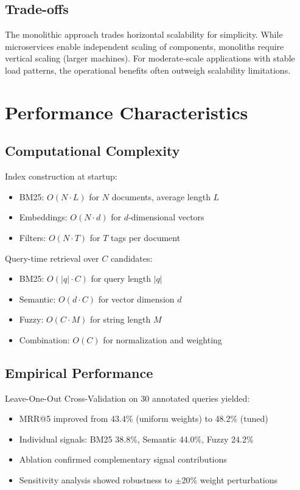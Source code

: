 \subsection{Trade-offs}

The monolithic approach trades horizontal scalability for simplicity. While microservices enable independent scaling of components, monoliths require vertical scaling (larger machines). For moderate-scale applications with stable load patterns, the operational benefits often outweigh scalability limitations.

\section{Performance Characteristics}

\subsection{Computational Complexity}

Index construction at startup:
\begin{itemize}[leftmargin=*,itemsep=2pt,topsep=2pt]
\item BM25: $O(N \cdot L)$ for $N$ documents, average length $L$
\item Embeddings: $O(N \cdot d)$ for $d$-dimensional vectors
\item Filters: $O(N \cdot T)$ for $T$ tags per document
\end{itemize}

Query-time retrieval over $C$ candidates:
\begin{itemize}[leftmargin=*,itemsep=2pt,topsep=2pt]
\item BM25: $O(|q| \cdot C)$ for query length $|q|$
\item Semantic: $O(d \cdot C)$ for vector dimension $d$
\item Fuzzy: $O(C \cdot M)$ for string length $M$
\item Combination: $O(C)$ for normalization and weighting
\end{itemize}

\subsection{Empirical Performance}

Leave-One-Out Cross-Validation on 30 annotated queries yielded:
\begin{itemize}[leftmargin=*,itemsep=2pt,topsep=2pt]
\item MRR@5 improved from 43.4\% (uniform weights) to 48.2\% (tuned)
\item Individual signals: BM25 38.8\%, Semantic 44.0\%, Fuzzy 24.2\%
\item Ablation confirmed complementary signal contributions
\item Sensitivity analysis showed robustness to $\pm$20\% weight perturbations
\end{itemize}

